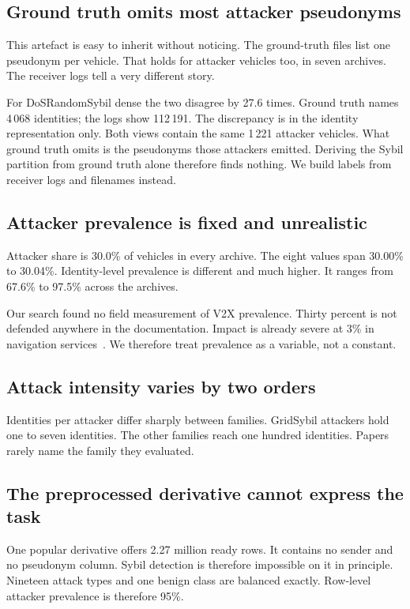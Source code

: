 \documentclass[journal,twoside]{IEEEtran}
\begin{document}
\subsection{Ground truth omits most attacker pseudonyms}

This artefact is easy to inherit without noticing.
The ground-truth files list one pseudonym per vehicle.
That holds for attacker vehicles too, in seven archives.
The receiver logs tell a very different story.

For DoSRandomSybil dense the two disagree by 27.6 times.
Ground truth names 4\,068 identities; the logs show 112\,191.
The discrepancy is in the identity representation only.
Both views contain the same 1\,221 attacker vehicles.
What ground truth omits is the pseudonyms those attackers emitted.
Deriving the Sybil partition from ground truth alone therefore finds nothing.
We build labels from receiver logs and filenames instead.

\subsection{Attacker prevalence is fixed and unrealistic}

Attacker share is 30.0\% of vehicles in every archive.
The eight values span 30.00\% to 30.04\%.
Identity-level prevalence is different and much higher.
It ranges from 67.6\% to 97.5\% across the archives.

Our search found no field measurement of V2X prevalence.
Thirty percent is not defended anywhere in the documentation.
Impact is already severe at 3\% in navigation services~\cite{soderhall2025}.
We therefore treat prevalence as a variable, not a constant.

\subsection{Attack intensity varies by two orders}

Identities per attacker differ sharply between families.
GridSybil attackers hold one to seven identities.
The other families reach one hundred identities.
Papers rarely name the family they evaluated.

\subsection{The preprocessed derivative cannot express the task}

One popular derivative offers 2.27 million ready rows.
It contains no sender and no pseudonym column.
Sybil detection is therefore impossible on it in principle.
Nineteen attack types and one benign class are balanced exactly.
Row-level attacker prevalence is therefore 95\%.
\end{document}

